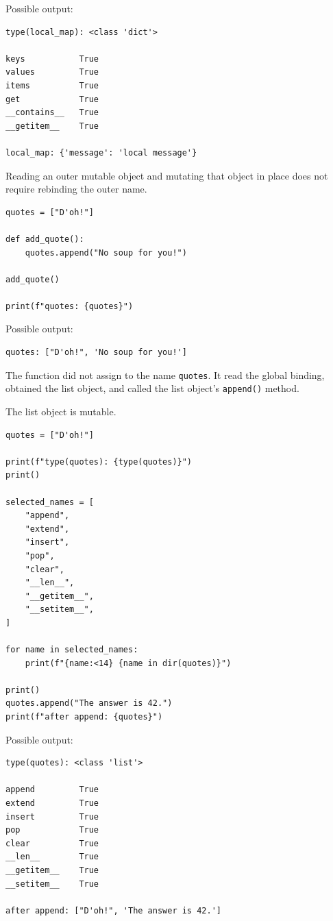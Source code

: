 Possible output:

\begin{verbatim}
type(local_map): <class 'dict'>

keys           True
values         True
items          True
get            True
__contains__   True
__getitem__    True

local_map: {'message': 'local message'}
\end{verbatim}

Reading an outer mutable object and mutating that object in place does not require rebinding the outer name.

\begin{verbatim}
quotes = ["D'oh!"]

def add_quote():
    quotes.append("No soup for you!")

add_quote()

print(f"quotes: {quotes}")
\end{verbatim}

Possible output:

\begin{verbatim}
quotes: ["D'oh!", 'No soup for you!']
\end{verbatim}

The function did not assign to the name \texttt{quotes}. It read the global binding, obtained the list object, and called the list object's \texttt{append()} method.

The list object is mutable.

\begin{verbatim}
quotes = ["D'oh!"]

print(f"type(quotes): {type(quotes)}")
print()

selected_names = [
    "append",
    "extend",
    "insert",
    "pop",
    "clear",
    "__len__",
    "__getitem__",
    "__setitem__",
]

for name in selected_names:
    print(f"{name:<14} {name in dir(quotes)}")

print()
quotes.append("The answer is 42.")
print(f"after append: {quotes}")
\end{verbatim}

Possible output:

\begin{verbatim}
type(quotes): <class 'list'>

append         True
extend         True
insert         True
pop            True
clear          True
__len__        True
__getitem__    True
__setitem__    True

after append: ["D'oh!", 'The answer is 42.']
\end{verbatim}

